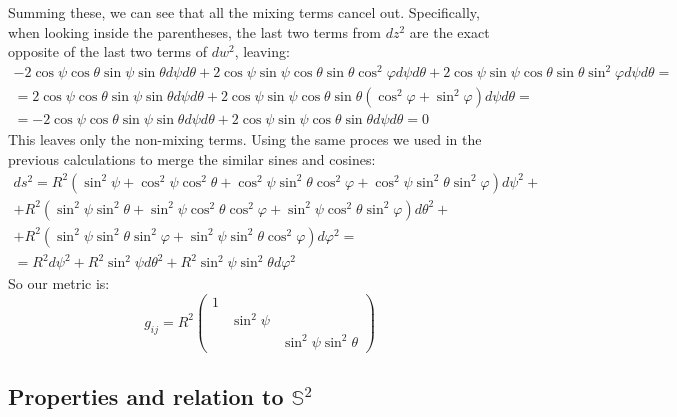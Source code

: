 \documentclass{article}
\begin{document}
Summing these, we can see that all the mixing terms cancel out. Specifically, when looking inside the parentheses, the last two terms from $dz^2$ are the exact opposite of the last two terms of $dw^2$, leaving:
\begin{equation}
\begin{gathered}
    - 2\cos\psi\cos\theta\sin\psi\sin\theta d\psi d\theta + 2\cos\psi\sin\psi\cos\theta\sin\theta\cos^2\varphi d\psi d\theta + 2\cos\psi\sin\psi\cos\theta\sin\theta\sin^2\varphi d\psi d\theta = \\ =
    2\cos\psi\cos\theta\sin\psi\sin\theta d\psi d\theta + 
    2\cos\psi\sin\psi\cos\theta\sin\theta(\cos^2\varphi + \sin^2\varphi) d\psi d\theta = \\ =
    - 2\cos\psi\cos\theta\sin\psi\sin\theta d\psi d\theta + 
    2\cos\psi\sin\psi\cos\theta\sin\theta d\psi d\theta = 0
\end{gathered}
\end{equation}
This leaves only the non-mixing terms. Using the same proces we used in the previous calculations to merge the similar sines and cosines:
\begin{equation}
\begin{gathered}
    ds^2 = 
    R^2(\sin^2\psi + \cos^2\psi\cos^2\theta + \cos^2\psi\sin^2\theta\cos^2\varphi + \cos^2\psi\sin^2\theta\sin^2\varphi)d\psi^2 + \\ + R^2(\sin^2\psi\sin^2\theta + \sin^2\psi\cos^2\theta\cos^2\varphi + \sin^2\psi\cos^2\theta\sin^2\varphi)d\theta^2 + \\ + R^2(\sin^2\psi\sin^2\theta\sin^2\varphi + \sin^2\psi\sin^2\theta\cos^2\varphi)d\varphi^2 = \\
    = R^2d\psi^2 + R^2\sin^2\psi d\theta^2 + R^2\sin^2\psi\sin^2\theta d\varphi^2
\end{gathered}
\end{equation}
So our metric is:
\begin{equation}
    g_{ij} = R^2\begin{pmatrix}
        1 & & \\ & \sin^2\psi & \\ & & \sin^2\psi\sin^2\theta
    \end{pmatrix}
\end{equation}
\subsection{Properties and relation to $\mathbb{S}^2$}
\end{document}
